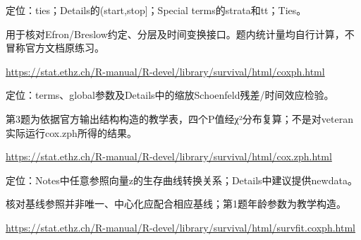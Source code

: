 \par\noindent\begin{minipage}{\linewidth}\raggedright{}\label{src:G5-COXPH}
\par
定位：ties；Details的(start,stop]；Special terms的strata和tt；Ties。\par
用于核对Efron/Breslow约定、分层及时间变换接口。题内统计量均自行计算，不冒称官方文档原练习。\par
{\small \url{https://stat.ethz.ch/R-manual/R-devel/library/survival/html/coxph.html}}\par
\end{minipage}\par\medskip

\par\noindent\begin{minipage}{\linewidth}\raggedright{}\label{src:G5-PH}
\par
定位：terms、global参数及Details中的缩放Schoenfeld残差/时间效应检验。\par
第3题为依据官方输出结构构造的教学表，四个P值经χ²分布复算；不是对veteran实际运行cox.zph所得的结果。\par
{\small \url{https://stat.ethz.ch/R-manual/R-devel/library/survival/html/cox.zph.html}}\par
\end{minipage}\par\medskip

\par\noindent\begin{minipage}{\linewidth}\raggedright{}\label{src:G5-CURVES}
\par
定位：Notes中任意参照向量z的生存曲线转换关系；Details中建议提供newdata。\par
核对基线参照并非唯一、中心化应配合相应基线；第1题年龄参数为教学构造。\par
{\small \url{https://stat.ethz.ch/R-manual/R-devel/library/survival/html/survfit.coxph.html}}\par
\end{minipage}\par\medskip

